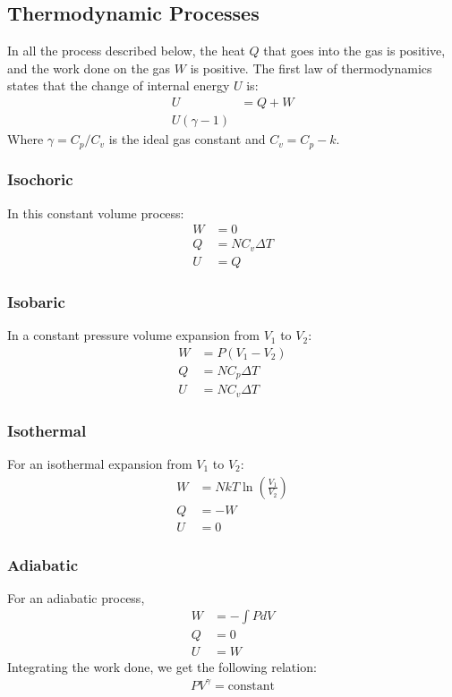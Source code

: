 \documentclass[11pt, letterpaper]{article}
\begin{document}
\begin{multicols*}{3}
\subsection{Thermodynamic Processes}
In all the process described below, the heat $Q$ that goes into the gas is positive, and the work done on the gas $W$ is positive. The first law of thermodynamics states that the change of internal energy $U$ is:
\begin{align*}
  U &= Q + W \\
  U (\gamma - 1)
\end{align*}
Where $\gamma = C_p/C_v$ is the ideal gas constant and $C_v = C_p - k$.
\subsubsection{Isochoric}
In this constant volume process:
\begin{align*}
  W &= 0 \\
  Q &= N C_v \Delta T \\
  U &= Q
\end{align*}

\subsubsection{Isobaric}
In a constant pressure volume expansion from $V_1$ to $V_2$:
\begin{align*}
  W &= P(V_1 - V_2) \\
  Q &= N C_p \Delta T \\
  U &= N C_v \Delta T
\end{align*}

\subsubsection{Isothermal}
For an isothermal expansion from $V_1$ to $V_2$:
\begin{align*}
  W &= NkT \ln \left( \frac{V_1}{V_2} \right) \\
  Q &= - W \\
  U &= 0 
\end{align*}

\subsubsection{Adiabatic}
For an adiabatic process,
\begin{align*}
  W &= - \int P dV \\
  Q &= 0 \\
  U &= W
\end{align*}
Integrating the work done, we get the following relation:
\begin{align*}
  PV^{\gamma} = \text{constant}
\end{align*}


\end{multicols*}
\end{document}
